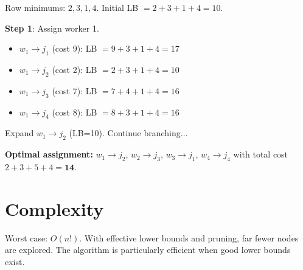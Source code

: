 \documentclass[12pt]{article}
\begin{document}
Row minimums: $2, 3, 1, 4$. Initial LB $= 2+3+1+4 = 10$.

\textbf{Step 1}: Assign worker 1.
\begin{itemize}
  \item $w_1 \to j_1$ (cost 9): LB $= 9 + 3 + 1 + 4 = 17$
  \item $w_1 \to j_2$ (cost 2): LB $= 2 + 3 + 1 + 4 = 10$
  \item $w_1 \to j_3$ (cost 7): LB $= 7 + 4 + 1 + 4 = 16$
  \item $w_1 \to j_4$ (cost 8): LB $= 8 + 3 + 1 + 4 = 16$
\end{itemize}

Expand $w_1 \to j_2$ (LB=10). Continue branching...

\textbf{Optimal assignment:} $w_1 \to j_2$, $w_2 \to j_3$, $w_3 \to j_1$, $w_4 \to j_4$
with total cost $2+3+5+4 = \mathbf{14}$.

\section{Complexity}

Worst case: $O(n!)$. With effective lower bounds and pruning, far fewer nodes are explored.
The algorithm is particularly efficient when good lower bounds exist.
\end{document}

